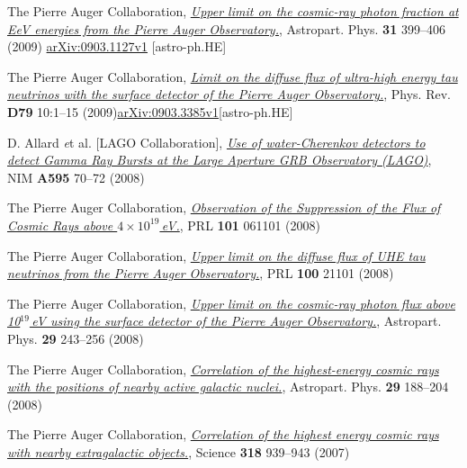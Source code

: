 \documentclass[11pt, a4paper]{article}
\newcommand{\years}[1]{\marginnote{\scriptsize #1}}
\begin{document}
\begin{etaremune}
\item \years{2009}The Pierre Auger Collaboration,
\href{http://dx.doi.org/10.1016/j.astropartphys.2009.04.003}{\emph{Upper limit
on the cosmic-ray photon fraction at EeV energies from the Pierre Auger
Observatory.}}, Astropart. Phys. {\bf 31} 399--406 (2009) 
\href{http://arxiv.org/abs/0903.1127/}{arXiv:0903.1127v1} [astro-ph.HE]

\item \years{2009}The Pierre Auger Collaboration,
\href{http://dx.doi.org/10.1103/PhysRevD.79.102001}{\emph{Limit on the diffuse
flux of ultra-high energy tau neutrinos with the surface detector of the Pierre
Auger Observatory.}}, Phys. Rev. {\bf D79} 10:1--15
(2009)\href{http://arxiv.org/abs/0903.3385/}{arXiv:0903.3385v1}[astro-ph.HE]

\item \years{2008}D. Allard {\emph et al.} [LAGO Collaboration],
\href{http://dx.doi.org/10.1016/j.nima.2008.07.041}{\emph{Use of
water-Cherenkov detectors to detect Gamma Ray Bursts at the Large Aperture GRB
Observatory (LAGO)}}, NIM {\bf A595} 70--72 (2008)

\item \years{2008}The Pierre Auger Collaboration,
\href{http://dx.doi.org/10.1103/PhysRevLett.101.061101}{\emph{Observation of
the Suppression of the Flux of Cosmic Rays above $4\times10^{19}$\,eV.}}, PRL
{\bf 101} 061101 (2008)

\item \years{2008}The Pierre Auger Collaboration,
\href{http://dx.doi.org/10.1103/PhysRevLett.100.211101}{\emph{Upper limit on
the diffuse flux of UHE tau neutrinos from the Pierre Auger Observatory.}}, PRL
{\bf 100} 21101 (2008)

\item \years{2008}The Pierre Auger Collaboration,
\href{http://dx.doi.org/10.1016/j.astropartphys.2008.01.003}{\emph{Upper limit
on the cosmic-ray photon flux above 10$^{19}$\,eV using the surface detector of
the Pierre Auger Observatory.}}, Astropart. Phys. {\bf 29} 243--256 (2008)

\item \years{2008}The Pierre Auger Collaboration,
\href{http://dx.doi.org/10.1016/j.astropartphys.2008.01.002}{\emph{Correlation
of the highest-energy cosmic rays with the positions of nearby active galactic
nuclei.}}, Astropart. Phys. {\bf 29} 188--204 (2008)

\item \years{2007}The Pierre Auger Collaboration,
\href{http://dx.doi.org/10.1126/science.1151124}{\emph{Correlation of the
highest energy cosmic rays with nearby extragalactic objects.}}, Science {\bf
318} 939--943 (2007)


\end{etaremune}
\end{document}

